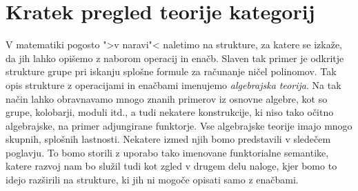 \documentclass[../kategoricna_logika.tex]{subfiles}
\begin{document}
\section{Kratek pregled teorije kategorij}
V matematiki pogosto ">v naravi"< naletimo na strukture, za katere se izkaže,
da jih lahko opišemo z naborom operacij in enačb.
Slaven tak primer je odkritje strukture grupe pri iskanju splošne formule
za računanje ničel polinomov.
Tak opis strukture z operacijami in enačbami imenujemo \emph{algebrajska teorija}.
Na tak način lahko obravnavamo mnogo znanih primerov iz osnovne algebre,
kot so grupe, kolobarji, moduli itd., a tudi nekatere konstrukcije, ki niso
tako očitno algebrajske, na primer adjungirane funktorje.
Vse algebrajske teorije imajo mnogo skupnih, splošnih lastnosti.
Nekatere izmed njih bomo predstavili v sledečem poglavju.
To bomo storili z uporabo tako imenovane funktorialne semantike, katere
razvoj nam bo služil tudi kot zgled v drugem delu naloge, kjer bomo to
idejo razširili na strukture, ki jih ni mogoče opisati samo z enačbami.
\end{document}
